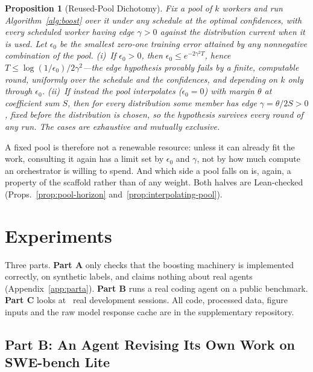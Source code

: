 \documentclass{article}
\newtheorem{proposition}[theorem]{Proposition}
\theoremstyle{remark}
\theoremstyle{plain}
\begin{document}
\begin{proposition}[Reused-Pool Dichotomy]
\label{prop:pool-dichotomy}
Fix a pool of $k$ workers and run Algorithm~\ref{alg:boost} over it under any schedule at the optimal confidences, with every scheduled worker having edge $\gamma>0$ against the distribution current when it is used. Let $\epsilon_0$ be the smallest zero-one training error attained by any nonnegative combination of the pool. (i)~If $\epsilon_0>0$, then $\epsilon_0\le e^{-2\gamma^2T}$, hence $T\le\log(1/\epsilon_0)/2\gamma^2$---the edge hypothesis provably fails by a finite, computable round, uniformly over the schedule and the confidences, and depending on $k$ only through $\epsilon_0$. (ii)~If instead the pool interpolates ($\epsilon_0{=}0$) with margin $\theta$ at coefficient sum $S$, then for \emph{every} distribution some member has edge $\gamma{=}\theta/2S>0$, fixed \emph{before} the distribution is chosen, so the hypothesis survives every round of any run. The cases are exhaustive and mutually exclusive.
\end{proposition}

A fixed pool is therefore not a renewable resource: unless it can already fit the work, consulting it again has a limit set by $\epsilon_0$ and $\gamma$, not by how much compute an orchestrator is willing to spend. And which side a pool falls on is, again, a property of the scaffold rather than of any weight. Both halves are Lean-checked (Props.~\ref{prop:pool-horizon} and~\ref{prop:interpolating-pool}).

\section{Experiments}
\label{sec:experiments}

Three parts. \textbf{Part A} only checks that the boosting machinery is implemented correctly, on synthetic labels, and claims nothing about real agents (Appendix~\ref{app:parta}). \textbf{Part B} runs a real coding agent on a public benchmark. \textbf{Part C} looks at \statPCSessions\ real development sessions. All code, processed data, figure inputs and the raw model response cache are in the supplementary repository.

\subsection{Part B: An Agent Revising Its Own Work on SWE-bench Lite}
\label{sec:partB}
\end{document}
